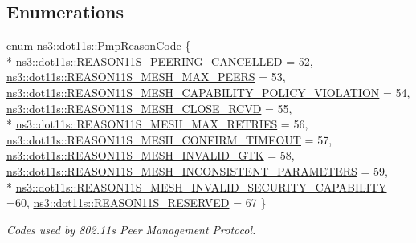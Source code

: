 \subsection*{Enumerations}
\begin{DoxyCompactItemize}
\item 
enum \hyperlink{group__dot11s_ga1132ec5975c87960ceb86ea54481aba6}{ns3\+::dot11s\+::\+Pmp\+Reason\+Code} \{ \\*
\hyperlink{group__dot11s_gga1132ec5975c87960ceb86ea54481aba6ab7a7fcea22d68ba038856480ea34fdd8}{ns3\+::dot11s\+::\+R\+E\+A\+S\+O\+N11\+S\+\_\+\+P\+E\+E\+R\+I\+N\+G\+\_\+\+C\+A\+N\+C\+E\+L\+L\+ED} = 52, 
\hyperlink{group__dot11s_gga1132ec5975c87960ceb86ea54481aba6ab70ebebb2518212636d97aa78a083169}{ns3\+::dot11s\+::\+R\+E\+A\+S\+O\+N11\+S\+\_\+\+M\+E\+S\+H\+\_\+\+M\+A\+X\+\_\+\+P\+E\+E\+RS} = 53, 
\hyperlink{group__dot11s_gga1132ec5975c87960ceb86ea54481aba6aae9441b25fc7316ae53a6e73398521e5}{ns3\+::dot11s\+::\+R\+E\+A\+S\+O\+N11\+S\+\_\+\+M\+E\+S\+H\+\_\+\+C\+A\+P\+A\+B\+I\+L\+I\+T\+Y\+\_\+\+P\+O\+L\+I\+C\+Y\+\_\+\+V\+I\+O\+L\+A\+T\+I\+ON} = 54, 
\hyperlink{group__dot11s_gga1132ec5975c87960ceb86ea54481aba6a66a9d95025c42e4e00d49efa6ece82a3}{ns3\+::dot11s\+::\+R\+E\+A\+S\+O\+N11\+S\+\_\+\+M\+E\+S\+H\+\_\+\+C\+L\+O\+S\+E\+\_\+\+R\+C\+VD} = 55, 
\\*
\hyperlink{group__dot11s_gga1132ec5975c87960ceb86ea54481aba6ab4a78ee9f92e1a9644447dc6d895f317}{ns3\+::dot11s\+::\+R\+E\+A\+S\+O\+N11\+S\+\_\+\+M\+E\+S\+H\+\_\+\+M\+A\+X\+\_\+\+R\+E\+T\+R\+I\+ES} = 56, 
\hyperlink{group__dot11s_gga1132ec5975c87960ceb86ea54481aba6adb681bf7add7cb193a7e9b3e0147875c}{ns3\+::dot11s\+::\+R\+E\+A\+S\+O\+N11\+S\+\_\+\+M\+E\+S\+H\+\_\+\+C\+O\+N\+F\+I\+R\+M\+\_\+\+T\+I\+M\+E\+O\+UT} = 57, 
\hyperlink{group__dot11s_gga1132ec5975c87960ceb86ea54481aba6a992af53cebe30af98c1acc0054bb7bae}{ns3\+::dot11s\+::\+R\+E\+A\+S\+O\+N11\+S\+\_\+\+M\+E\+S\+H\+\_\+\+I\+N\+V\+A\+L\+I\+D\+\_\+\+G\+TK} = 58, 
\hyperlink{group__dot11s_gga1132ec5975c87960ceb86ea54481aba6a98ddea6f69878fdde8dba52112bdd96d}{ns3\+::dot11s\+::\+R\+E\+A\+S\+O\+N11\+S\+\_\+\+M\+E\+S\+H\+\_\+\+I\+N\+C\+O\+N\+S\+I\+S\+T\+E\+N\+T\+\_\+\+P\+A\+R\+A\+M\+E\+T\+E\+RS} = 59, 
\\*
\hyperlink{group__dot11s_gga1132ec5975c87960ceb86ea54481aba6aab89215a9518c367d4998f025fffa630}{ns3\+::dot11s\+::\+R\+E\+A\+S\+O\+N11\+S\+\_\+\+M\+E\+S\+H\+\_\+\+I\+N\+V\+A\+L\+I\+D\+\_\+\+S\+E\+C\+U\+R\+I\+T\+Y\+\_\+\+C\+A\+P\+A\+B\+I\+L\+I\+TY} =60, 
\hyperlink{group__dot11s_gga1132ec5975c87960ceb86ea54481aba6a1e76395872503ccadd9cf008e325b3d8}{ns3\+::dot11s\+::\+R\+E\+A\+S\+O\+N11\+S\+\_\+\+R\+E\+S\+E\+R\+V\+ED} = 67
 \}\begin{DoxyCompactList}\small\item\em Codes used by 802.\+11s Peer Management Protocol. \end{DoxyCompactList}
\end{DoxyCompactItemize}


